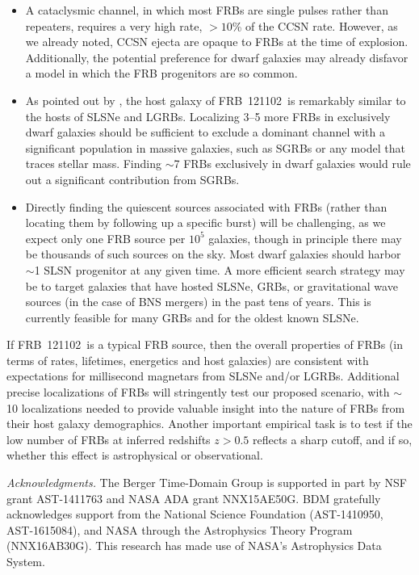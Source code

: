 \documentclass[twocolumn]{aastex6}
\newcommand{\apx}{\ensuremath{\sim}}
\newcommand{\repeater}{FRB~121102}
\begin{document}
\begin{itemize}
\item A cataclysmic channel, in which most FRBs are single pulses rather than repeaters, requires a very high rate, $>10$\% of the CCSN rate. However, as we already noted, CCSN ejecta are opaque to FRBs at the time of explosion.  Additionally, the potential preference for dwarf galaxies may already disfavor a model in which the FRB progenitors are so common.

\item As pointed out by \citet{tbc+.2017}, the host galaxy of \repeater\ is remarkably similar to the hosts of SLSNe and LGRBs. Localizing 3--5 more FRBs in exclusively dwarf galaxies should be sufficient to exclude a dominant channel with a significant population in massive galaxies, such as SGRBs or any model that traces stellar mass. Finding \apx7 FRBs exclusively in dwarf galaxies would rule out a significant contribution from SGRBs.

\item Directly finding the quiescent sources associated with FRBs (rather than locating them by following up a specific burst) will be challenging, as we expect only one FRB source per $10^5$ galaxies, though in principle there may be thousands of such sources on the sky. Most dwarf galaxies should harbor \apx1 SLSN progenitor at any given time. A more efficient search strategy may be to target galaxies that have hosted SLSNe, GRBs, or gravitational wave sources (in the case of BNS mergers) in the past tens of years. This is currently feasible for many GRBs and for the oldest known SLSNe.
\end{itemize}

If \repeater\ is a typical FRB source, then the overall properties of FRBs (in terms of rates, lifetimes, energetics and host galaxies) are consistent with expectations for millisecond magnetars from SLSNe and/or LGRBs. Additional precise localizations of FRBs will stringently test our proposed scenario, with \apx10 localizations needed to provide valuable insight into the nature of FRBs from their host galaxy demographics. Another important empirical task is to test if the low number of FRBs at inferred redshifts $z > 0.5$ reflects a sharp cutoff, and if so, whether this effect is astrophysical or observational.


\acknowledgments \textit{Acknowledgments.}
The Berger Time-Domain Group is supported in part by NSF grant AST-1411763 and NASA ADA grant NNX15AE50G.
BDM gratefully acknowledges support from the National Science Foundation (AST-1410950, AST-1615084), and NASA through the Astrophysics Theory Program (NNX16AB30G). 
This research has made use of NASA's Astrophysics Data System.



\end{document}
